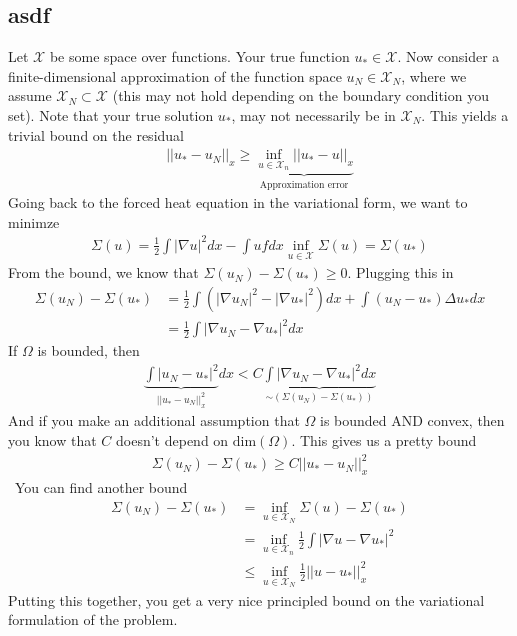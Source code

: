 \subsection{asdf}
Let $\mathcal X$ be some space over functions. Your true function $u_* \in \mathcal X$. Now consider a finite-dimensional approximation of the function space $u_N \in \mathcal X_N$, where we assume $\mathcal X_N \subset \mathcal X$ (this may not hold depending on the boundary condition you set). Note that your true solution $u_*$, may not necessarily be in $\mathcal X_N$. This yields a trivial bound on the residual
\begin{align}
	||u_* - u_N||_{x} \geq \underbrace{\inf_{u \in \mathcal X_n} ||u_* - u||_x}_{\text{Approximation error}}
\end{align}
Going back to the forced heat equation in the variational form, we want to minimze
\begin{align}
	\Sigma(u) = \frac{1}{2} \int |\nabla u |^2 dx - \int u f dx
	\inf_{u \in \mathcal X} \Sigma(u) = \Sigma(u_*)
\end{align}
From the bound, we know that $\Sigma(u_N)  - \Sigma(u_*)\geq  0$. Plugging this in
\begin{align}
	\Sigma(u_N) - \Sigma(u_*) & = \frac{1}{2} \int( |\nabla u_N|^2 - |\nabla u_*|^2 ) dx + \int (u_N - u_*) \Delta u_* dx\\
	& = \frac{1}{2} \int |\nabla u_N - \nabla u_*|^2 dx
\end{align}
If $\Omega$ is bounded, then
\begin{align}
	\underbrace{\int |u_N - u_*|^2}_{||u_* - u_N||^2_x} dx < C \underbrace{\int |\nabla u_N - \nabla u_*|^2 dx}_{\sim (\Sigma(u_N) - \Sigma(u_*))}
\end{align}
And if you make an additional assumption that $\Omega$ is bounded AND convex, then you know that $C$ doesn't depend on $\text{dim}(\Omega)$. This gives us a pretty bound
\begin{align}
	\Sigma(u_N) - \Sigma(u_*) \geq  C || u_* - u_N||^2_x
\end{align}\
You can find another bound
\begin{align}
	\Sigma(u_N) - \Sigma(u_*) & = \inf_{u \in \mathcal X_N} \Sigma(u) - \Sigma(u_*)\\
	& = \inf_{u \in \mathcal X_n} \frac{1}{2} \int |\nabla u - \nabla u_*|^2\\
	& \leq \inf_{u \in \mathcal X_N} \frac{1}{2} || u - u_* ||^2_x
\end{align}
Putting this together, you get a very nice principled bound on the variational formulation of the problem.
